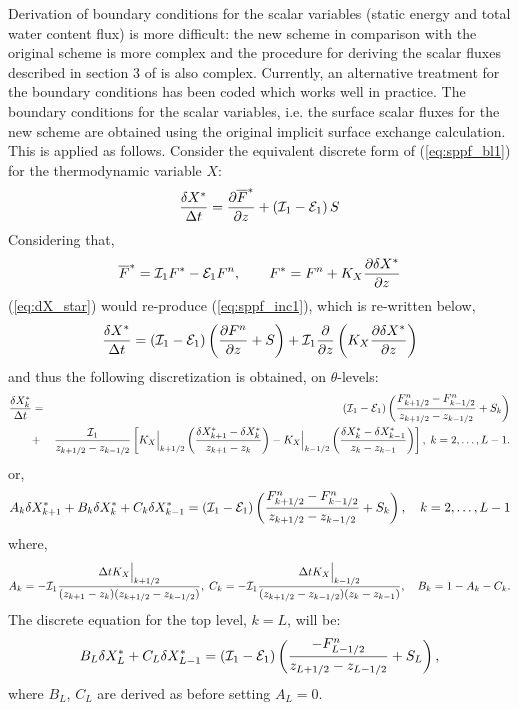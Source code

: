 \documentclass{UMDP_article}
\begin{document}
\noindent
Derivation of boundary conditions for the scalar variables (static
energy and total water content flux) is more difficult: the new scheme
in comparison with the original scheme is more complex and the
procedure for deriving the scalar fluxes described in section 3 of
\cite{esseryetal2001} is also complex. Currently, an alternative
treatment for the boundary conditions has been coded which works well
in practice. The boundary conditions for the scalar variables,
i.e. the surface scalar fluxes for the new scheme are obtained using
the original implicit surface exchange calculation. This is applied as
follows. Consider the equivalent discrete form of (\ref{eq:sppf_bl1})
for the thermodynamic variable $X$:
\begin{equation} 
  \frac{\delta X^{*}}{\Delta t}
  =\frac{\partial\overline{F}^{*}}{\partial z}+\left({\cal I}_{1}-{\cal E}_{1}\right)S\label{eq:dX_star}
\end{equation}
Considering that, 
\begin{equation}
  \overline{F}^{*}={\cal I}_{1}F^{*}-{\cal E}_{1}F^{n},\qquad
  F^{*}=F^{n}+K_{X}\frac{\partial\delta X^{*}}{\partial z}\label{eq:dX_star2}
\end{equation} (\ref{eq:dX_star})
would re-produce (\ref{eq:sppf_inc1}), which is re-written below,
\begin{equation*}
  \frac{\delta X^{*}}{\Delta t}=({\cal I}_{1}-{\cal E}_{1})\left(\frac{\partial F^{n}}{\partial z}+S\right)+{\cal I}_{1}\frac{\partial}{\partial z}\left(K_{X}\frac{\partial\delta X^{*}}{\partial z}\right)
\end{equation*}
and thus the following discretization is obtained, on $\theta$-levels:
\begin{eqnarray*}
  \frac{\delta X_{k}^{*}}{\Delta t} & = & \left({\cal I}_{1}-{\cal E}_{1}\right)\left(\frac{F_{k+1/2}^{n}-F_{k-1/2}^{n}}{z_{k+1/2}-z_{k-1/2}}+S_{k}\right)\\
  & +&\frac{{\cal I}_{1}}{z_{k+1/2}-z_{k-1/2}}\left[K_{X}\Big|_{k+1/2}\left(\frac{\delta X_{k+1}^{*}-\delta X_{k}^{*}}{z_{k+1}-z_{k}}\right)-K_{X}\Big|_{k-1/2}\left(\frac{\delta X_{k}^{*}-\delta X_{k-1}^{*}}{z_{k}-z_{k-1}}\right)\right],\; k=2,\ldots,L-1.\end{eqnarray*}
or,
\begin{equation}
  A_{k}\delta X_{k+1}^{*}+B_{k}\delta X_{k}^{*}+C_{k}\delta X_{k-1}^{*}=\left({\cal I}_{1}-{\cal E}_{1}\right)\left(\frac{F_{k+1/2}^{n}-F_{k-1/2}^{n}}{z_{k+1/2}-z_{k-1/2}}+S_{k}\right),\quad k=2,\ldots,L-1\label{eq:dX_disc}
\end{equation}
where,
\begin{equation*}
  A_{k}=-{\cal I}_{1}\frac{\Delta tK_{X}\Big|_{k+1/2}}{(z_{k+1}-z_{k})(z_{k+1/2}-z_{k-1/2})},\; C_{k}=-{\cal I}_{1}\frac{\Delta tK_{X}\Big|_{k-1/2}}{(z_{k+1/2}-z_{k-1/2})(z_{k}-z_{k-1})},\quad B_{k}=1-A_{k}-C_{k}.
\end{equation*}
The discrete equation for the top level, $k=L$, will be:
\begin{equation}
  B_{L}\delta X_{L}^{*}+C_{L}\delta X_{L-1}^{*}=\left({\cal I}_{1}-{\cal E}_{1}\right)\left(\frac{-F_{L-1/2}^{n}}{z_{L+1/2}-z_{L-1/2}}+S_{L}\right),\label{eq:dX_disc_top}
\end{equation}
where $B_{L}$, $C_{L}$ are derived as before setting $A_{L}=0$.
\end{document}
